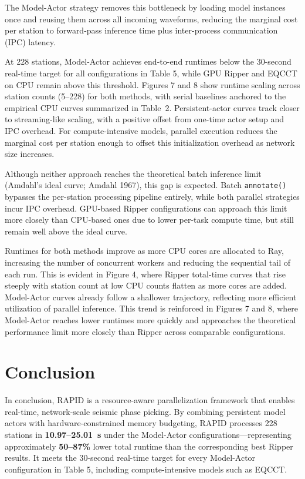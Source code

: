 The Model-Actor strategy removes this bottleneck by loading model instances once and reusing them across all incoming waveforms, reducing the marginal cost per station to forward-pass inference time plus inter-process communication (IPC) latency.

At 228 stations, Model-Actor achieves end-to-end runtimes below the 30-second real-time target for all configurations in Table 5, while GPU Ripper and EQCCT on CPU remain above this threshold. Figures 7 and 8 show runtime scaling across station counts (5--228) for both methods, with serial baselines anchored to the empirical CPU curves summarized in Table~2. Persistent-actor curves track closer to streaming-like scaling, with a positive offset from one-time actor setup and IPC overhead. For compute-intensive models, parallel execution reduces the marginal cost per station enough to offset this initialization overhead as network size increases.

Although neither approach reaches the theoretical batch inference limit (Amdahl’s ideal curve; Amdahl 1967), this gap is expected. Batch \texttt{annotate()} bypasses the per-station processing pipeline entirely, while both parallel strategies incur IPC overhead. GPU-based Ripper configurations can approach this limit more closely than CPU-based ones due to lower per-task compute time, but still remain well above the ideal curve.

Runtimes for both methods improve as more CPU cores are allocated to Ray, increasing the number of concurrent workers and reducing the sequential tail of each run. This is evident in Figure 4, where Ripper total-time curves that rise steeply with station count at low CPU counts flatten as more cores are added. Model-Actor curves already follow a shallower trajectory, reflecting more efficient utilization of parallel inference. This trend is reinforced in Figures 7 and 8, where Model-Actor reaches lower runtimes more quickly and approaches the theoretical performance limit more closely than Ripper across comparable configurations.

\section{Conclusion}

In conclusion, RAPID is a resource-aware parallelization framework that enables real-time, network-scale seismic phase picking. By combining persistent model actors with hardware-constrained memory budgeting, RAPID processes 228 stations in \textbf{10.97--25.01~s} under the Model-Actor configurations---representing approximately \textbf{50--87\%} lower total runtime than the corresponding best Ripper results. It meets the 30-second real-time target for every Model-Actor configuration in Table 5, including compute-intensive models such as EQCCT.

